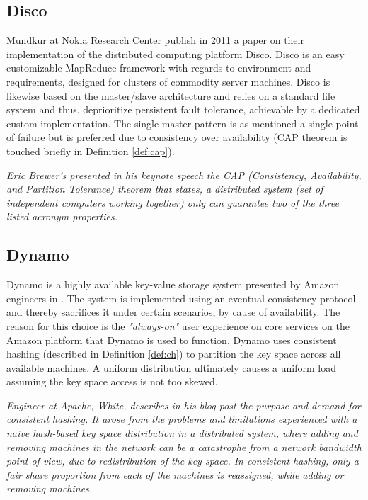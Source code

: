 \subsection*{Disco}
Mundkur \etal at Nokia Research Center publish in 2011 a paper on their implementation of the distributed computing platform Disco\cite{PageDisco}\cite{Mundkur:2011:DCP:2034654.2034670}. Disco is an easy customizable MapReduce framework with regards to environment and requirements, designed for clusters of commodity server machines. Disco is likewise based on the master/slave architecture and relies on a standard file system and thus, deprioritize persistent fault tolerance, achievable by a dedicated custom implementation. The single master pattern is as mentioned a single point of failure but is preferred due to consistency over availability (CAP theorem is touched briefly in Definition \ref{def:cap}).
\vspace*{5mm}

\begin{definition} \label{def:cap}
\textit{Eric Brewer's presented in his keynote speech}\cite{Brewer2000} \textit{the CAP (Consistency, Availability, and Partition Tolerance) theorem that states, a distributed system (set of independent computers working together) only can guarantee two of the three listed acronym properties.}
\end{definition}

\vspace*{3mm}
\subsection*{Dynamo}
Dynamo is a highly available key-value storage system presented by Amazon engineers in \cite{DeCandia:2007:DAH:1294261.1294281}. The system is implemented using an eventual consistency protocol and thereby sacrifices it under certain scenarios, by cause of availability. The reason for this choice is the \textit{"always-on"} user experience on core services on the Amazon platform that Dynamo is used to function. Dynamo uses consistent hashing (described in Definition \ref{def:ch}) to partition the key space across all available machines. A uniform distribution ultimately causes a uniform load assuming the key space access is not too skewed.
\vspace*{3mm}

\begin{definition} \label{def:ch}
\textit{Engineer at Apache, White, describes in his blog post} \cite{PageWhiteCH} \textit{the purpose and demand for consistent hashing. It arose from the problems and limitations experienced with a naive hash-based key space distribution in a distributed system, where adding and removing machines in the network can be a catastrophe from a network bandwidth point of view, due to redistribution of the key space. In consistent hashing, only a fair share proportion from each of the machines is reassigned, while adding or removing machines.}
\end{definition}

